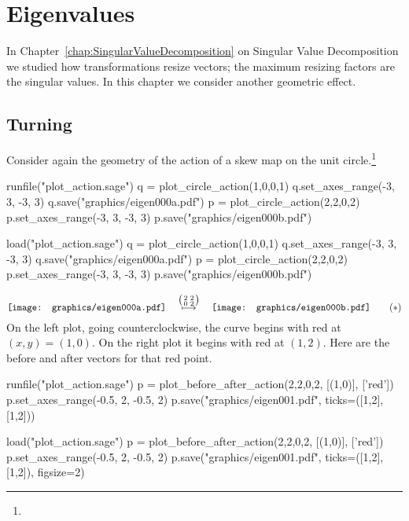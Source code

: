 \chapter{Eigenvalues}

In Chapter~\ref{chap:SingularValueDecomposition} on 
Singular Value Decomposition we studied how
transformations resize vectors; the maximum resizing factors
are the singular values.
In this chapter we consider another geometric effect.


\section{Turning}
Consider again the geometry of the action of a skew map on the unit 
circle.\footnote{\noterightmult}
\begin{sageoutput}
runfile("plot_action.sage")  
q = plot_circle_action(1,0,0,1) 
q.set_axes_range(-3, 3, -3, 3) 
q.save("graphics/eigen000a.pdf")
p = plot_circle_action(2,2,0,2) 
p.set_axes_range(-3, 3, -3, 3) 
p.save("graphics/eigen000b.pdf")
\end{sageoutput}
\begin{sagesilent}
load("plot_action.sage")  
q = plot_circle_action(1,0,0,1) 
q.set_axes_range(-3, 3, -3, 3) 
q.save("graphics/eigen000a.pdf")
p = plot_circle_action(2,2,0,2) 
p.set_axes_range(-3, 3, -3, 3) 
p.save("graphics/eigen000b.pdf")
\end{sagesilent}
\begin{equation*} \label{gr:firstgraphic}
  \vcenteredhbox{\texttt{[image: graphics/eigen000a.pdf]}}
  \quad\mapsunder{\big (\begin{smallmatrix} 2 &2 \\ 0 &2 \end{smallmatrix}\big )}\quad
  \vcenteredhbox{\texttt{[image: graphics/eigen000b.pdf]}}
  \tag{$*$}
\end{equation*}
On the left plot, going counterclockwise, 
the curve begins with red at $(x,y)=(1,0)$.
On the right plot it begins with red at $(1,2)$.
Here are the before and after vectors for that red point.
\begin{sageoutput}[d,0,1;d,2,4]
runfile("plot_action.sage")  
p = plot_before_after_action(2,2,0,2, [(1,0)], ['red']) 
p.set_axes_range(-0.5, 2, -0.5, 2) 
p.save("graphics/eigen001.pdf", ticks=([1,2],[1,2]))
\end{sageoutput}
\begin{sagesilent}
load("plot_action.sage")  
p = plot_before_after_action(2,2,0,2, [(1,0)], ['red']) 
p.set_axes_range(-0.5, 2, -0.5, 2) 
p.save("graphics/eigen001.pdf", ticks=([1,2],[1,2]), figsize=2)
\end{sagesilent}
